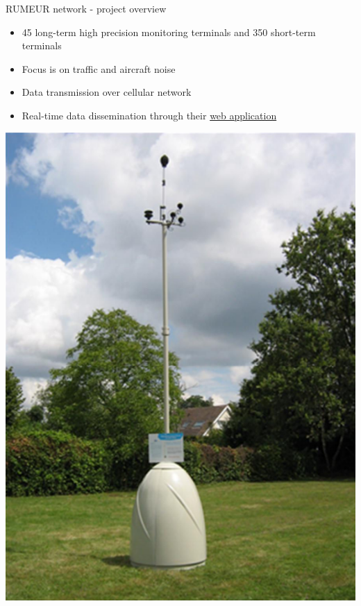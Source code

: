 \documentclass{beamer}
\newcommand{\myhref}[2]{{\color{blue}\href{#1}{#2}}}
\begin{document}
    \begin{frame}{RUMEUR network - project overview} 
        \begin{minipage}{0.5\linewidth}
        \begin{itemize}
            \item 45 long-term high precision monitoring terminals and 350 short-term terminals
            \item Focus is on traffic and aircraft noise
            \item Data transmission over cellular network
            \item Real-time data dissemination through their \myhref{http://rumeur.bruitparif.fr/}{web application}  
        \end{itemize} 
        \end{minipage}
        \begin{minipage}{0.45\linewidth}
            \includegraphics[scale=0.3]{figures/rumeur_longterm}
        \end{minipage}
    \end{frame}
    
\end{document}
